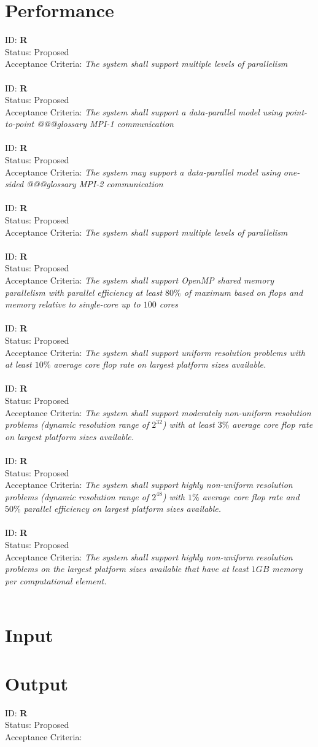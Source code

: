 \documentclass{book}
\newcommand{\req}[3]{
ID: \textbf{R#1} \\
Status: \textsf{#2} \\
Acceptance Criteria: \textit{#3} \\
\\
}
\begin{document}
\section{Performance}
\req{}{Proposed}{The system shall support multiple levels of parallelism}
\req{}{Proposed}{The system shall support a data-parallel model using point-to-point @@@glossary MPI-1 communication}
\req{}{Proposed}{The system may support a data-parallel model using one-sided @@@glossary MPI-2 communication} 
\req{}{Proposed}{The system shall support multiple levels of parallelism}
\req{}{Proposed}{The system shall support OpenMP shared memory parallelism with parallel efficiency at least $80\%$ of maximum based on flops and memory relative to single-core up to $100$ cores}
\req{}{Proposed}{The system shall support uniform resolution problems with at least $10\%$ average core flop rate on largest platform sizes available.}
\req{}{Proposed}{The system shall support moderately non-uniform resolution problems (dynamic resolution range of $2^32$) with at least $3\%$ average core flop rate on largest platform sizes available.}
\req{}{Proposed}{The system shall support highly non-uniform resolution problems (dynamic resolution range of $2^48$) with $1\%$ average core flop rate and $50\%$ parallel efficiency on largest platform sizes available.}
\req{}{Proposed}{The system shall support highly non-uniform resolution problems on the largest platform sizes available that have at least $1GB$ memory per computational element.}

\section{Input}

\section{Output}
\req{}{Proposed}{}

\appendix
\end{document}
